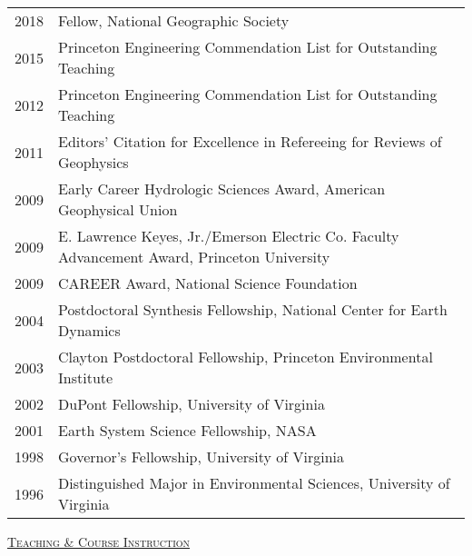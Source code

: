 \documentclass[10pt]{report}
\begin{document}
\begin{tabular}{l l}


2018 & Fellow, National Geographic Society \\
2015 & Princeton Engineering Commendation List for Outstanding Teaching \\
2012 & Princeton Engineering Commendation List for Outstanding Teaching \\ 
2011 & Editors' Citation for Excellence in Refereeing for Reviews of Geophysics \\
2009 & Early Career Hydrologic Sciences Award, American Geophysical Union \\  
2009 & E. Lawrence Keyes, Jr./Emerson Electric Co. Faculty Advancement Award, Princeton University \\
2009 & CAREER Award, National Science Foundation \\
2004 & Postdoctoral Synthesis Fellowship, National Center for Earth Dynamics \\
2003 & Clayton Postdoctoral Fellowship, Princeton Environmental Institute \\
2002 & DuPont Fellowship, University of Virginia \\
2001 & Earth System Science Fellowship, NASA \\
1998 & Governor's Fellowship, University of Virginia \\
1996 & Distinguished Major in Environmental Sciences, University of Virginia \\
\end{tabular}

\vspace{.1in}

\textsc{\underline{Teaching \& Course Instruction}}
\end{document}
